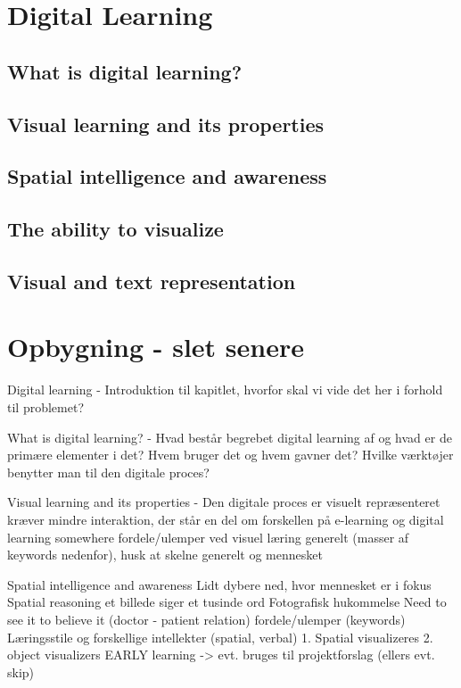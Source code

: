 \section{Digital Learning}\label{ch:digital_learning_ch}
\subsection{What is digital learning?}\label{ch:what_is_digital_learning}
\subsection{Visual learning and its properties}\label{ch:visual_learning_and_its_properties}
\subsection{Spatial intelligence and awareness}\label{ch:spatial_intelligence_and_awareness}

\subsection{The ability to visualize}\label{ch:the_ability_to_visualize}
\subsection{Visual and text representation}\label{ch:visual_and_text_representation}

\section{Opbygning - slet senere}\label{ch:opbygning}
Digital learning - Introduktion til kapitlet, hvorfor skal vi vide det her i forhold til problemet?

What is digital learning? - Hvad består begrebet digital learning af og hvad er de primære elementer i det? 
    Hvem bruger det og hvem gavner det? 
    Hvilke værktøjer benytter man til den digitale proces?

  Visual learning and its properties - Den digitale proces er visuelt repræsenteret
    kræver mindre interaktion, der står en del om forskellen på e-learning og digital learning somewhere
    fordele/ulemper ved visuel læring generelt (masser af keywords nedenfor), husk at skelne generelt og mennesket

  Spatial intelligence and awareness
    Lidt dybere ned, hvor mennesket er i fokus
    Spatial reasoning
    et billede siger et tusinde ord
    Fotografisk hukommelse
    Need to see it to believe it (doctor - patient relation)
    fordele/ulemper (keywords)
    Læringsstile og forskellige intellekter (spatial, verbal)
    1. Spatial visualizeres 2. object visualizers
    EARLY learning -> evt. bruges til projektforslag (ellers evt. skip)
  
